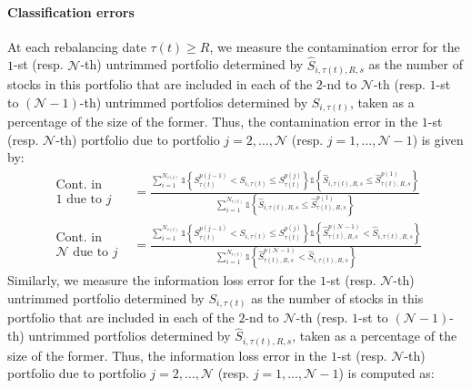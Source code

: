 \paragraph{Classification errors} At each rebalancing date $\tau(t) \geq R$, we measure the contamination error for the $1$-st (resp. $\mathcal{N}$-th) untrimmed portfolio determined by $\widehat{S}_{i,\tau(t),R,s}$ as the number of stocks in this portfolio that are included in each of the $2$-nd to $\mathcal{N}$-th (resp. $1$-st to $(\mathcal{N}-1)$-th) untrimmed portfolios determined by $S_{i,\tau(t)}$, taken as a percentage of the size of the former. Thus, the contamination error in the $1$-st (resp. $\mathcal{N}$-th) portfolio due to portfolio $j=2,\ldots, \mathcal{N}$ (resp. $j=1,\ldots, \mathcal{N}-1$) is given by:
\begin{align*}
\begin{aligned}
\text{Cont. in}\\[-11pt]
\text{$1$ due to $j$} 
\end{aligned}
&= \frac{\sum_{i=1}^{N_{\tau(t)}} \mathds{1} \left\{ S_{\tau(t) }^{p(j-1)} < S_{i,\tau(t)} \leq S_{\tau(t) }^{p(j)} \right\} \mathds{1} \left\{ \widehat{S}_{i,\tau(t),R,s} \leq \widehat{S}_{\tau(t),R,s}^{p(1)}\right\}}{\sum_{i=1}^{N_{\tau(t)}} \mathds{1} \left\{ \widehat{S}_{i,\tau(t),R,s}\leq \widehat{S}_{\tau(t),R,s}^{p(1)}\right\}} \\
\begin{aligned}
\text{Cont. in}\\[-11pt]
\text{$\mathcal{N}$ due to $j$}
\end{aligned}
&= \frac{\sum_{i=1}^{N_{\tau(t)}} \mathds{1} \left\{ S_{\tau(t) }^{p(j-1)} < S_{i,\tau(t)} \leq S_{\tau(t) }^{p(j)} \right\} \mathds{1} \left\{ \widehat{S}_{\tau(t),R,s}^{p(\mathcal{N}-1)} < \widehat{S}_{i,\tau(t),R,s} \right\}}{\sum_{i=1}^{N_{\tau(t)}} \mathds{1} \left\{ \widehat{S}_{\tau(t),R,s}^{p(\mathcal{N}-1)} < \widehat{S}_{i,\tau(t),R,s} \right\}}
\end{align*}
Similarly, we measure the information loss error for the $1$-st (resp. $\mathcal{N}$-th) untrimmed portfolio determined by $S_{i,\tau(t)}$ as the number of stocks in this portfolio that are included in each of the $2$-nd to $\mathcal{N}$-th (resp. $1$-st to $(\mathcal{N}-1)$-th) untrimmed portfolios determined by $\widehat{S}_{i,\tau(t),R,s}$, taken as a percentage of the size of the former. Thus, the information loss error in the $1$-st (resp. $\mathcal{N}$-th) portfolio due to portfolio $j=2,\ldots, \mathcal{N}$ (resp. $j=1,\ldots, \mathcal{N}-1$) is computed as:
